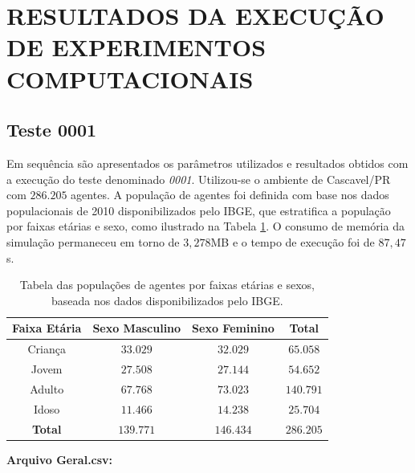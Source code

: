 \section{RESULTADOS DA EXECUÇÃO DE EXPERIMENTOS COMPUTACIONAIS}
\label{sec:resultados}

\subsection{Teste 0001}

Em sequência são apresentados os parâmetros utilizados e resultados obtidos com a execução do teste denominado \textit{0001}. Utilizou-se o ambiente de Cascavel/PR com $286.205$ agentes. A população de agentes foi definida com base nos dados populacionais de 2010 disponibilizados pelo IBGE, que estratifica a população por faixas etárias e sexo, como ilustrado na Tabela \ref{tab:populacoes_0001}. O consumo de memória da simulação permaneceu em torno de $3,278$MB e o tempo de execução foi de $87,47$s. \\

\begin{table}[H]
\centering
\begin{tabular}{c|c|c|c}
 \textbf{Faixa Etária} 		& \textbf{Sexo Masculino}	& \textbf{Sexo Feminino}	& \textbf{Total}	\\ \hline
  Criança			& $33.029$			& $32.029$			& $65.058$		\\
  Jovem				& $27.508$			& $27.144$			& $54.652$		\\
  Adulto			& $67.768$			& $73.023$			& $140.791$		\\
  Idoso				& $11.466$			& $14.238$ 			& $25.704$		\\ \hline
  \textbf{Total}		& $139.771$			& $146.434$			& $286.205$		\\
\end{tabular}
\caption{Tabela das populações de agentes por faixas etárias e sexos, baseada nos dados disponibilizados pelo IBGE.}
\label{tab:populacoes_0001}
\end{table}

\newpage

\textbf{Arquivo Geral.csv:} 

\begin{center}
\end{center}

